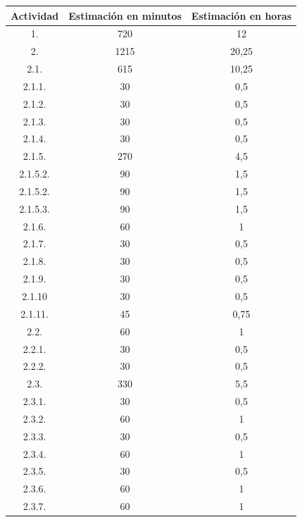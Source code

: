 \begin{longtable}{c|c|c}
\rowcolor{black}
\color{white}
\textbf{Actividad} & \color{white} \textbf{Estimación en minutos} & \color{white} \textbf{Estimación en horas} \\ \hline

\rowcolor{black!80}
\color{white}1. & \color{white}720 & \color{white}12 \\ \hline

\rowcolor{black!80}
\color{white}2. & \color{white}1215 & \color{white}20,25 \\ \hline

\rowcolor{black!40}
2.1. & 615 & 10,25 \\ \hline
2.1.1. & 30 & 0,5 \\ \hline
2.1.2. & 30 & 0,5 \\ \hline
2.1.3. & 30 & 0,5 \\ \hline
2.1.4. & 30 & 0,5 \\ \hline

\rowcolor{black!20}
2.1.5. & 270 & 4,5 \\ \hline
2.1.5.2. & 90 & 1,5 \\ \hline
2.1.5.2. & 90 & 1,5 \\ \hline
2.1.5.3. & 90 & 1,5 \\ \hline
2.1.6. & 60 & 1 \\ \hline
2.1.7. & 30 & 0,5 \\ \hline
2.1.8. & 30 & 0,5 \\ \hline
2.1.9. & 30 & 0,5 \\ \hline
2.1.10 & 30 & 0,5 \\ \hline
2.1.11. & 45 & 0,75 \\ \hline

\rowcolor{black!40}
2.2. & 60 & 1 \\ \hline
2.2.1. & 30 & 0,5 \\ \hline
2.2.2. & 30 & 0,5 \\ \hline

\rowcolor{black!40}
2.3. & 330 & 5,5 \\ \hline
2.3.1. & 30 & 0,5 \\ \hline
2.3.2. & 60 & 1 \\ \hline
2.3.3. & 30 & 0,5 \\ \hline
2.3.4. & 60 & 1 \\ \hline
2.3.5. & 30 & 0,5 \\ \hline
2.3.6. & 60 & 1 \\ \hline
2.3.7. & 60 & 1 \\ \hline


\end{longtable}
